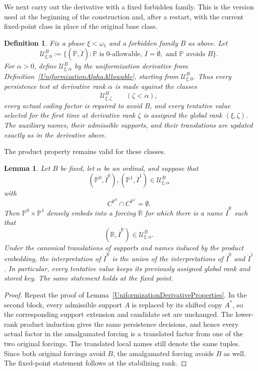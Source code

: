 \documentclass[a4paper,11pt]{article}
\newtheorem{lemma}[theorem]{Lemma}
\newtheorem{definition}[theorem]{Definition}
\newcommand{\forceP}{\mathbb{P}}
\begin{document}
We next carry out the derivative with a fixed forbidden family. This is the version used at the beginning of the construction and, after a restart, with the current fixed-point class in place of the original base class.

\begin{definition}\label{FixedBUniformizationDerivative}
Fix a phase $\xi<\omega_1$ and a forbidden family $B$ as above. Let
\[
\mathcal U^B_{\xi,0}
:=
\{(\forceP,\dot I):\forceP\text{ is $0$-allowable, }\dot I=\check\emptyset,
\text{ and }\forceP\text{ avoids }B\}.
\]
For $\alpha>0$, define $\mathcal U^B_{\xi,\alpha}$ by the uniformization derivative from Definition~\ref{UniformizationAlphaAllowable}, starting from $\mathcal U^B_{\xi,0}$. Thus every persistence test at derivative rank $\alpha$ is made against the classes
\[
\mathcal U^B_{\xi,\zeta}
\qquad(\zeta<\alpha),
\]
every actual coding factor is required to avoid $B$, and every tentative value selected for the first time at derivative rank $\zeta$ is assigned the global rank $(\xi,\zeta)$. The auxiliary names, their admissible supports, and their translations are updated exactly as in the derivative above.
\end{definition}

The product property remains valid for these classes.

\begin{lemma}\label{ProductLemmaUniformizationAvoidingB}
Let $B$ be fixed, let $\alpha$ be an ordinal, and suppose that
\[
(\mathbb P^0,\dot I^0),(\mathbb P^1,\dot I^1)
\in\mathcal U^B_{\xi,\alpha}
\]
with
\[
C^{\mathbb P^0}\cap C^{\mathbb P^1}=\emptyset.
\]
Then $\mathbb P^0\times\mathbb P^1$ densely embeds into a forcing $\mathbb R$ for which there is a name $\dot I^{\mathbb R}$ such that
\[
(\mathbb R,\dot I^{\mathbb R})
\in\mathcal U^B_{\xi,\alpha}.
\]
Under the canonical translations of supports and names induced by the product embedding, the interpretation of $\dot I^{\mathbb R}$ is the union of the interpretations of $\dot I^0$ and $\dot I^1$. In particular, every tentative value keeps its previously assigned global rank and stored key. The same statement holds at the fixed point.
\end{lemma}

\begin{proof}
Repeat the proof of Lemma~\ref{UniformizationDerivativeProperties}. In the second block, every admissible support $A$ is replaced by its shifted copy $A^*$, so the corresponding support extension and candidate set are unchanged. The lower-rank product induction gives the same persistence decisions, and hence every actual factor in the amalgamated forcing is a translated factor from one of the two original forcings. The translated local names still denote the same tuples. Since both original forcings avoid $B$, the amalgamated forcing avoids $B$ as well. The fixed-point statement follows at the stabilizing rank.
\end{proof}
\end{document}
